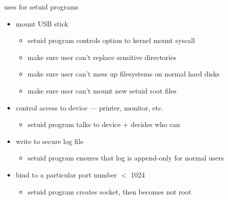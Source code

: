 
\begin{frame}{uses for setuid programs}
\begin{itemize}
    \item mount USB stick
        \begin{itemize}
        \item setuid program controls option to kernel mount syscall
        \item make sure user can't replace sensitive directories
        \item make sure user can't mess up filesystems on normal hard disks
        \item make sure user can't mount new setuid root files
        \end{itemize}
    \item control access to device --- printer, monitor, etc.
        \begin{itemize}
        \item setuid program talks to device + decides who can
        \end{itemize}
    \item write to secure log file
        \begin{itemize}
        \item setuid program ensures that log is append-only for normal users
        \end{itemize}
    \item bind to a particular port number $<$ 1024
        \begin{itemize}
        \item setuid program creates socket, then becomes not root
        \end{itemize}
\end{itemize}
\end{frame}
